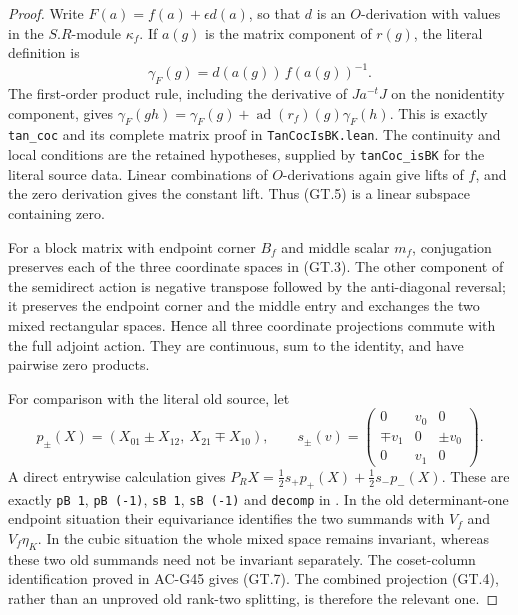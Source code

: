 \begin{proof}
Write $F(a)=f(a)+\epsilon d(a)$, so that $d$ is an $O$-derivation
with values in the $S.R$-module $\kappa_f$.  If $a(g)$ is the
matrix component of $r(g)$, the literal definition is
\[
       \gamma_F(g)=d(a(g))\,f(a(g))^{-1}.                       \tag{GT.9}
\]
The first-order product rule, including the derivative of
$J a^{-t}J$ on the nonidentity component, gives
$\gamma_F(gh)=\gamma_F(g)+\operatorname{ad}(r_f)(g)\gamma_F(h)$.
This is exactly \texttt{tan\_coc} and its complete matrix proof
in \texttt{TanCocIsBK.lean}.  The continuity and local conditions
are the retained hypotheses, supplied by \texttt{tanCoc\_isBK}
for the literal source data.  Linear combinations of $O$-derivations
again give lifts of $f$, and the zero derivation gives the constant
lift.  Thus (GT.5) is a linear subspace containing zero.

For a block matrix with endpoint corner $B_f$ and middle scalar
$m_f$, conjugation preserves each of the three coordinate spaces
in (GT.3).  The other component of the semidirect action is
negative transpose followed by the anti-diagonal reversal;
it preserves the endpoint corner and the middle entry and
exchanges the two mixed rectangular spaces.  Hence all three
coordinate projections commute with the full adjoint action.
They are continuous, sum to the identity, and have pairwise
zero products.

For comparison with the literal old source, let
\[
 p_\pm(X)=(X_{01}\pm X_{12},\ X_{21}\mp X_{10}),\qquad
 s_\pm(v)=\begin{pmatrix}
 0&v_0&0\\ \mp v_1&0&\pm v_0\\0&v_1&0
 \end{pmatrix}.
                                                               \tag{GT.10}
\]
A direct entrywise calculation gives
$P_RX=\tfrac12s_+p_+(X)+\tfrac12s_-p_-(X)$.
These are exactly \texttt{pB 1}, \texttt{pB (-1)},
\texttt{sB 1}, \texttt{sB (-1)} and \texttt{decomp} in
.
In the old determinant-one endpoint situation their equivariance
identifies the two summands with $V_f$ and $V_f\eta_K$.
In the cubic situation the whole mixed space remains invariant,
whereas these two old summands need not be invariant separately.
The coset-column identification proved in AC-G45 gives (GT.7).
The combined projection (GT.4), rather than an unproved old
rank-two splitting, is therefore the relevant one.


\end{proof}
